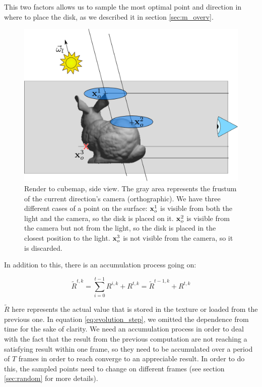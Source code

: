 This two factors allows us to sample the most optimal point and direction in where to place the disk, as we described it in section \ref{sec:m_overv}.
 
\begin{figure}[!ht]
\centering
\includegraphics[width=\linewidth]{images/method/step2}
\caption{Render to cubemap, side view. The gray area represents the frustum of the current direction's camera (orthographic). We have three different cases of a point on the surface: $\mathbf{x}_o^1$ is visible from both the light and the camera, so the disk is placed on it. $\mathbf{x}_o^2$ is visible from the camera but not from the light, so the disk is placed in the closest position to the light. $\mathbf{x}_o^3$ is not visible from the camera, so it is discarded.}
\label{fig:stepfrustum}
\end{figure} 

In addition to this, there is an accumulation process going on:

$$
\tilde{R}^{t,k} = \sum_{i = 0}^{t-1} R^{i,k} + R^{t,k} = \tilde{R}^{t-1, k} + R^{t,k}
$$

$\tilde{R}$ here represents the actual value that is stored in the texture or loaded from the previous one. In equation \ref{eq:evolution_step}, we omitted the dependence from time for the sake of clarity. We need an accumulation process in order to deal with the fact that the result from the previous computation are not reaching a satisfying result within one frame, so they need to be accumulated over a period of $T$ frames in order to reach converge to an appreciable result. In order to do this, the sampled points need to change on different frames (see section \ref{sec:random} for more details). 

